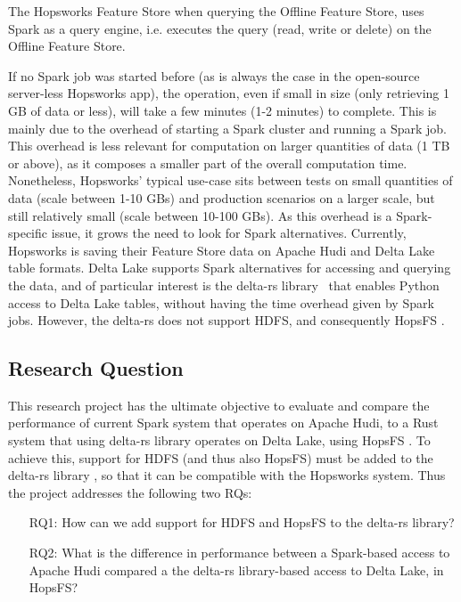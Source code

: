 The Hopsworks Feature Store \cite{HopsworksBatchRealtime2024} when querying the Offline Feature Store, uses Spark as a query engine, i.e. executes the query (read, write or delete) on the Offline Feature Store.

If no Spark job was started before (as is always the case in the open-source server-less Hopsworks app), the operation, even if small in size (only retrieving 1 GB of data or less), will take a few minutes (1-2 minutes) to complete. This is mainly due to the overhead of starting a Spark cluster and running a Spark job.
This overhead is less relevant for computation on larger quantities of data (1 TB or above), as it composes a smaller part of the overall computation time.
Nonetheless, Hopsworks' typical use-case sits between tests on small quantities of data (scale between 1-10 GBs) and production scenarios on a larger scale, but still relatively small (scale between 10-100 GBs).
As this overhead is a Spark-specific issue, it grows the need to look for Spark alternatives. Currently, Hopsworks is saving their Feature Store data on Apache Hudi and Delta Lake table formats. Delta Lake supports Spark alternatives for accessing and querying the data, and of particular interest is the delta-rs library~\cite{DeltaioDeltars2024} that enables Python access to Delta Lake tables, without having the time overhead given by Spark jobs. 
However, the delta-rs \cite{DeltaioDeltars2024} does not support \gls{HDFS}, and consequently \gls{HopsFS} \cite{niaziHopsFSScalingHierarchical2017}.

\subsection{Research Question}
\label{sec:researchQuestion}
This research project has the ultimate objective to evaluate and compare the performance of current Spark system that operates on Apache Hudi, to a Rust system that using delta-rs library \cite{DeltaioDeltars2024} operates on Delta Lake, using \gls{HopsFS} \cite{niaziHopsFSScalingHierarchical2017}. To achieve this, support for \gls{HDFS} (and thus also \gls{HopsFS}) must be added to the delta-rs library \cite{DeltaioDeltars2024}, so that it can be compatible with the Hopsworks system. Thus the project addresses the following two \glspl{RQ}:
\begin{enumerate}
    \item[RQ1:] How can we add support for \gls{HDFS} and \gls{HopsFS} to the delta-rs library?
    \item[RQ2:] What is the difference in performance between a Spark-based access to Apache Hudi compared a the delta-rs library-based access to Delta Lake, in \gls{HopsFS}?  
\end{enumerate}

